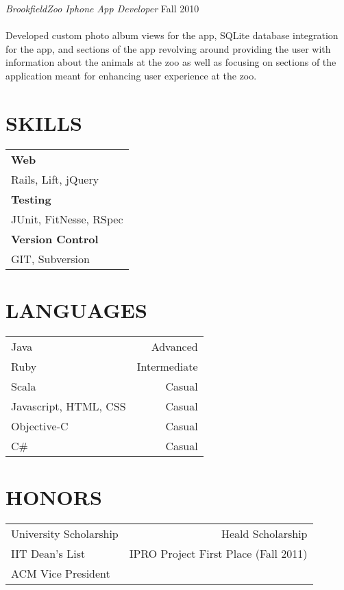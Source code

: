 \documentclass[margin]{res}
\newcommand{\tab}{\hspace*{2em}}
\begin{document}
\begin{resume}
               							 {\sl BrookfieldZoo Iphone App Developer} \hfill            Fall 2010 \\ \\
														\tab Developed custom photo album views for the app, SQLite database integration for the app, 
																 and sections of the app revolving around providing the user with information about the animals
																 at the zoo as well as focusing on sections of the application meant for enhancing user experience
																 at the zoo.
  
\section{SKILLS} 
		\begin{tabular}{ l }
		\bf Web \\
		\tab Rails, Lift, jQuery\\
		\bf Testing\\
		\tab JUnit, FitNesse, RSpec\\
		\bf Version Control\\
		\tab GIT, Subversion\\
		\end{tabular}

\section{LANGUAGES}
		\begin{tabular}{ l r }
  			Java & Advanced \\
 			Ruby & Intermediate \\
                   	Scala & Casual \\
                   	Javascript, HTML, CSS & Casual \\
                   	Objective-C & Casual \\
                 		C\# & Casual \\
		\end{tabular}
                 
\section{HONORS}
		\begin{tabular}{ l r }
  			University Scholarship & Heald Scholarship \\
 			IIT Dean's List & IPRO Project First Place (Fall 2011) \\
			ACM Vice President
		\end{tabular}

\end{resume}
\end{document}
